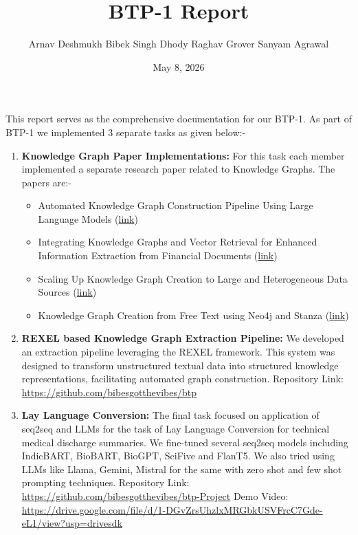 \documentclass[12pt]{article}
\title{BTP-1 Report}
\author{Arnav Deshmukh \quad Bibek Singh Dhody \quad Raghav Grover \quad Sanyam Agrawal}
\date{May 8, 2026}
\begin{document}
\maketitle

\vspace{2em}


\vspace{1.5em}

\noindent This report serves as the comprehensive documentation for our BTP-1. As part of BTP-1 we implemented 3 separate tasks as given below:-

\begin{enumerate}[label=\textbf{Task \arabic*:}, leftmargin=2cm]
    \item \textbf{Knowledge Graph Paper Implementations:} For this task each member implemented a separate research paper related to Knowledge Graphs. The papers are:-
    \begin{itemize}
        \item Automated Knowledge Graph Construction Pipeline Using Large Language Models (\href{https://arxiv.org/pdf/2403.08345}{link})
        \item Integrating Knowledge Graphs and Vector Retrieval for Enhanced Information Extraction from Financial Documents (\href{https://dl.acm.org/doi/pdf/10.1145/3677052.3698671}{link})
        \item Scaling Up Knowledge Graph Creation to Large and Heterogeneous Data Sources (\href{https://www.sciencedirect.com/science/article/abs/pii/S1570826822000397}{link})
        \item Knowledge Graph Creation from Free Text using Neo4j and Stanza (\href{https://dl.acm.org/doi/10.1145/3716554.3716624}{link})
    \end{itemize}
    \item \textbf{REXEL based Knowledge Graph Extraction Pipeline:} We developed an extraction pipeline leveraging the REXEL framework. This system was designed to transform unstructured textual data into structured knowledge representations, facilitating automated graph construction. Repository Link: \url{https://github.com/bibesgotthevibes/btp}
    \item \textbf{Lay Language Conversion:} The final task focused on application of seq2seq and LLMs for the task of Lay Language Conversion for technical medical discharge summaries. We fine-tuned several seq2seq models including IndicBART, BioBART, BioGPT, SciFive and FlanT5. We also tried using LLMs like Llama, Gemini, Mistral for the same with zero shot and few shot prompting techniques. Repository Link: \url{https://github.com/bibesgotthevibes/btp-Project} Demo Video: \url{https://drive.google.com/file/d/1-DGvZrsUhzlxMRGbkUSVFrcC7Gde-eL1/view?usp=drivesdk}
\end{enumerate}
\end{document}
